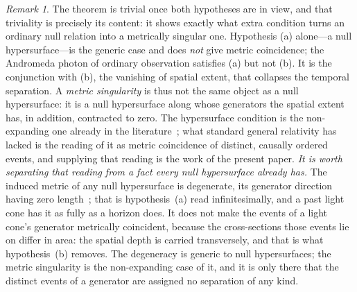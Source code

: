 \documentclass[11pt,a4paper]{article}
\theoremstyle{plain}
\theoremstyle{remark}
\newtheorem{remark}{Remark}
\begin{document}
\begin{remark}
The theorem is trivial once both hypotheses are in view, and that triviality is precisely its content: it shows exactly what extra condition turns an ordinary null relation into a metrically singular one. Hypothesis (a) alone---a null hypersurface---is the generic case and does \emph{not} give metric coincidence; the Andromeda photon of ordinary observation satisfies (a) but not (b). It is the conjunction with (b), the vanishing of spatial extent, that collapses the temporal separation. A \emph{metric singularity} is thus not the same object as a null hypersurface: it is a null hypersurface along whose generators the spatial extent has, in addition, contracted to zero. The hypersurface condition is the non-expanding one already in the literature~\cite{AshtekarKrishnan2004,GourgoulhonJaramillo2006}; what standard general relativity has lacked is the reading of it as metric coincidence of distinct, causally ordered events, and supplying that reading is the work of the present paper. \emph{It is worth separating that reading from a fact every null hypersurface already has.} The induced metric of any null hypersurface is degenerate, its generator direction having zero length~\cite{GourgoulhonJaramillo2006}; that is hypothesis~(a) read infinitesimally, and a past light cone has it as fully as a horizon does. It does not make the events of a light cone's generator metrically coincident, because the cross-sections those events lie on differ in area: the spatial depth is carried transversely, and that is what hypothesis~(b) removes. The degeneracy is generic to null hypersurfaces; the metric singularity is the non-expanding case of it, and it is only there that the distinct events of a generator are assigned no separation of any kind.
\end{remark}
\end{document}
